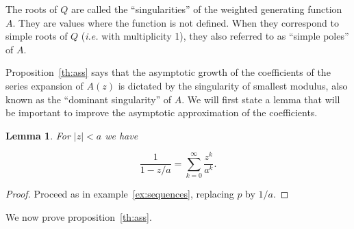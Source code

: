 \documentclass{article}
\newtheorem{lemma}{Lemma}
\begin{document}
The roots of $Q$ are called the ``singularities'' of the weighted
generating function $A$. They are values where the function is not
defined. When they correspond to simple roots of $Q$ (\textit{i.e.} with
multiplicity 1), they also referred to as ``simple poles'' of $A$.

Proposition~\ref{th:ass} says that the asymptotic growth of the
coefficients of the series expansion of $A(z)$ is dictated by the
singularity of smallest modulus, also known as the ``dominant
singularity'' of $A$. We will first state a lemma that will be
important to improve the asymptotic approximation of the coefficients.

\begin{lemma}
\label{lemma:poles}
For $|z| < a$ we have

\begin{equation}
\label{eq:poles}
\frac{1}{1-z/a} = \sum_{k=0}^\infty \frac{z^k}{a^k}.
\end{equation}
\end{lemma}

\begin{proof}
Proceed as in example~\ref{ex:sequences}, replacing $p$ by $1/a$.
\end{proof}

We now prove proposition~\ref{th:ass}.
\end{document}
